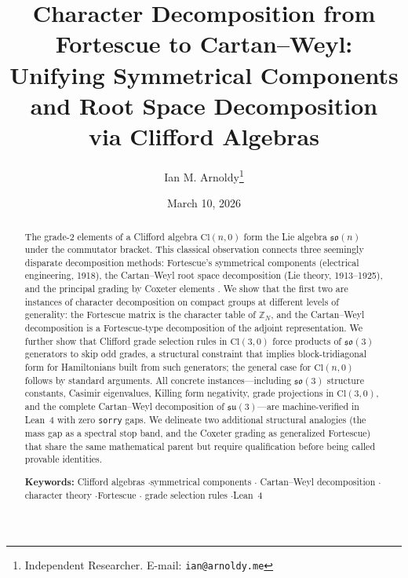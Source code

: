 \documentclass[11pt]{article}
\providecommand{\titlerunning}[1]{}
\providecommand{\authorrunning}[1]{}
\providecommand{\institute}[1]{}
\providecommand{\email}[1]{\texttt{#1}}
\providecommand{\keywords}[1]{%
  \begingroup\providecommand{\and}{}%
  \renewcommand{\and}{$\cdot$}%
  \par\medskip\noindent\textbf{Keywords:} #1\endgroup}
\newcommand{\so}{\mathfrak{so}}
\newcommand{\su}{\mathfrak{su}}
\newcommand{\Cl}{\mathrm{Cl}}
\newcommand{\ZZ}{\mathbb{Z}}
\begin{document}
\title{Character Decomposition from Fortescue to Cartan--Weyl: \\
  Unifying Symmetrical Components and Root Space Decomposition \\
  via Clifford Algebras}

\titlerunning{Character Decomposition from Fortescue to Cartan--Weyl}

\authorrunning{I.\,M.\ Arnoldy}

\author{Ian M. Arnoldy\thanks{Independent Researcher.
  E-mail: \texttt{ian@arnoldy.me}}}

\institute{
  Independent Researcher \\
  \email{ian@arnoldy.me}
}

\date{March 10, 2026}

\maketitle

\begin{abstract}
The grade-2 elements of a Clifford algebra $\Cl(n,0)$ form the
Lie algebra $\so(n)$ under the commutator bracket. This classical
observation connects three seemingly disparate decomposition methods:
Fortescue's symmetrical components (electrical engineering, 1918),
the Cartan--Weyl root space decomposition (Lie theory, 1913--1925),
and the principal grading by Coxeter elements \cite{coxeter1934}.
We show that the first two are instances of character decomposition
on compact groups at different levels of generality: the Fortescue
matrix is the character table of $\ZZ_N$, and the Cartan--Weyl
decomposition is a Fortescue-type decomposition of the adjoint
representation. We further show that Clifford grade selection rules
in $\Cl(3,0)$ force products of $\so(3)$ generators to skip odd
grades, a structural constraint that implies block-tridiagonal form
for Hamiltonians built from such generators; the general case for
$\Cl(n,0)$ follows by standard arguments. All concrete
instances---including $\so(3)$ structure constants, Casimir
eigenvalues, Killing form negativity, grade projections in $\Cl(3,0)$,
and the complete Cartan--Weyl decomposition of $\su(3)$---are
machine-verified in Lean~4 with zero \texttt{sorry} gaps. We
delineate two additional structural analogies (the mass gap as a
spectral stop band, and the Coxeter grading as generalized Fortescue)
that share the same mathematical parent but require qualification
before being called provable identities.

\keywords{Clifford algebras \and symmetrical components \and
Cartan--Weyl decomposition \and character theory \and Fortescue \and
grade selection rules \and Lean~4}
\end{abstract}
\end{document}
